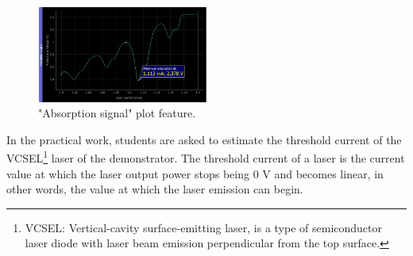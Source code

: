 \documentclass[a4paper,12pt]{article}
\begin{document}
\begin{figure}[!h]
    \centering
    \includegraphics[width=0.5\textwidth]{Images/absorption_signal.png}
    \captionsetup{justification=centering}
    \caption{"Absorption signal" plot feature.} 
    \label{fig:absorption_graph}
\end{figure}

In the practical work, students are asked to estimate the threshold current of the VCSEL\footnote{VCSEL: Vertical-cavity surface-emitting laser, is a type of semiconductor laser diode with laser beam emission perpendicular from the top surface.} laser of the demonstrator. The threshold current of a laser is the current value at which the laser output power stops being 0 V and becomes linear, in other words, the value at which the laser emission can begin.
\end{document}
